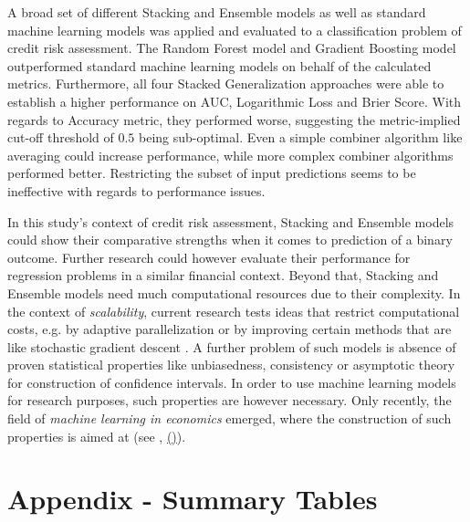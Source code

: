 \documentclass[12pt]{article}
\begin{document}
A broad set of different Stacking and Ensemble models as well as standard machine learning models was applied and evaluated to a classification problem of credit risk assessment. The Random Forest model and Gradient Boosting model outperformed standard machine learning models on behalf of the calculated metrics. Furthermore, all four Stacked Generalization approaches were able to establish a higher performance on AUC, Logarithmic Loss and Brier Score. With regards to Accuracy metric, they performed worse, suggesting the metric-implied cut-off threshold of $0.5$ being sub-optimal. Even a simple combiner algorithm like averaging could increase performance, while more complex combiner algorithms performed better. Restricting the subset of input predictions seems to be ineffective with regards to performance issues.

In this study's context of credit risk assessment, Stacking and Ensemble models could show their comparative strengths when it comes to prediction of a binary outcome. Further research could however evaluate their performance for regression problems in a similar financial context. Beyond that, Stacking and Ensemble models need much computational resources due to their complexity. In the context of \textit{scalability}, current research tests ideas that restrict computational costs, e.g. by adaptive parallelization \citep{li2014communication} or by improving certain methods that are like stochastic gradient descent \citep{bottou2012stochastic}. A further problem of such models is absence of proven statistical properties like unbiasedness, consistency or asymptotic theory for construction of confidence intervals. In order to use machine learning models for research purposes, such properties are however necessary. Only recently, the field of \textit{machine learning in economics} emerged, where the construction of such properties is aimed at (see \cite{athey2017impact} ,\citeauthor{wager2018est} \hyperlink{wager2018est}{(\color{DarkBlue}{in press})}).  







\newpage
\appendix
\section{Appendix - Summary Tables}
\end{document}
